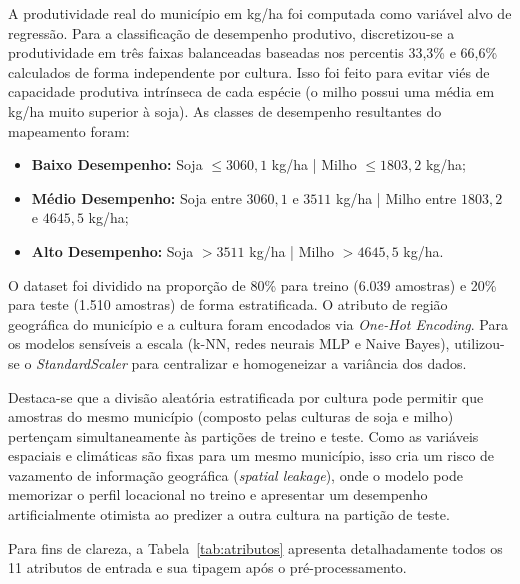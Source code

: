 \documentclass[conference]{IEEEtran}
\begin{document}
A produtividade real do município em kg/ha foi computada como variável alvo de regressão. Para a classificação de desempenho produtivo, discretizou-se a produtividade em três faixas balanceadas baseadas nos percentis 33,3\% e 66,6\% calculados de forma independente por cultura. Isso foi feito para evitar viés de capacidade produtiva intrínseca de cada espécie (o milho possui uma média em kg/ha muito superior à soja). As classes de desempenho resultantes do mapeamento foram:
\begin{itemize}
    \item \textbf{Baixo Desempenho:} Soja $\le 3060{,}1$ kg/ha | Milho $\le 1803{,}2$ kg/ha;
    \item \textbf{Médio Desempenho:} Soja entre $3060{,}1$ e $3511$ kg/ha | Milho entre $1803{,}2$ e $4645{,}5$ kg/ha;
    \item \textbf{Alto Desempenho:} Soja $> 3511$ kg/ha | Milho $> 4645{,}5$ kg/ha.
\end{itemize}

O dataset foi dividido na proporção de 80\% para treino (6.039 amostras) e 20\% para teste (1.510 amostras) de forma estratificada. O atributo de região geográfica do município e a cultura foram encodados via \textit{One-Hot Encoding}. Para os modelos sensíveis a escala (k-NN, redes neurais MLP e Naive Bayes), utilizou-se o \textit{StandardScaler} para centralizar e homogeneizar a variância dos dados. 

Destaca-se que a divisão aleatória estratificada por cultura pode permitir que amostras do mesmo município (composto pelas culturas de soja e milho) pertençam simultaneamente às partições de treino e teste. Como as variáveis espaciais e climáticas são fixas para um mesmo município, isso cria um risco de vazamento de informação geográfica (\textit{spatial leakage}), onde o modelo pode memorizar o perfil locacional no treino e apresentar um desempenho artificialmente otimista ao predizer a outra cultura na partição de teste.

Para fins de clareza, a Tabela~\ref{tab:atributos} apresenta detalhadamente todos os 11 atributos de entrada e sua tipagem após o pré-processamento.
\end{document}
